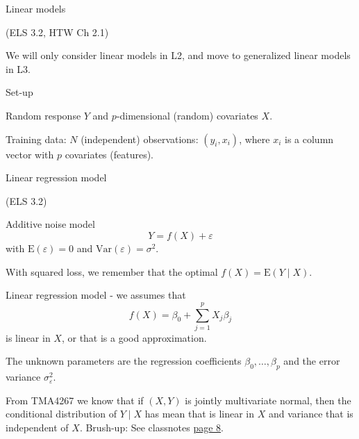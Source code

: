 \documentclass[
  ignorenonframetext,
]{beamer}
\begin{document}
\begin{frame}{Linear models}
\protect\hypertarget{linear-models}{}

(ELS 3.2, HTW Ch 2.1)

We will only consider linear models in L2, and move to generalized
linear models in L3.

\begin{block}{Set-up}

Random response \(Y\) and \(p\)-dimensional (random) covariates \(X\).

Training data: \(N\) (independent) observations: \((y_i,x_i)\), where
\(x_i\) is a column vector with \(p\) covariates (features).

\end{block}

\end{frame}

\begin{frame}

\begin{block}{Linear regression model}

(ELS 3.2)

Additive noise model \[ Y=f(X)+\varepsilon\] with
\(\text{E}(\varepsilon)=0\) and \(\text{Var}(\varepsilon)=\sigma^2\).

With squared loss, we remember that the optimal
\(f(X)=\text{E}(Y \mid X)\).

Linear regression model - we assumes that
\[f(X)=\beta_0+\sum_{j=1}^p X_{j}\beta_j \] is linear in \(X\), or that
is a good approximation.

The unknown parameters are the regression coefficients
\(\beta_0,\ldots,\beta_p\) and the error variance
\(\sigma^2_{\varepsilon}\).

From TMA4267 we know that if \((X,Y)\) is jointly multivariate normal,
then the conditional distribution of \(Y\mid X\) has mean that is linear
in \(X\) and variance that is independent of \(X\). Brush-up: See
classnotes
\href{https://www.math.ntnu.no/emner/TMA4267/2017v/TMA4267V2017Part2.pdf}{page
8}.

\end{block}

\end{frame}
\end{document}
